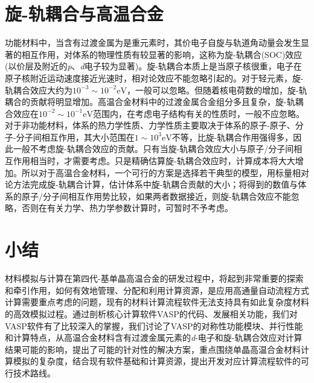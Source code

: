 \section{旋-轨耦合与高温合金}
功能材料中，当含有过渡金属为是重元素时，其价电子自旋与轨道角动量会发生显著的相互作用，对体系的物理性质有较显著的影响，这称为旋-轨耦合\textrm{(SOC)}效应(以价层及附近的\textit{p}、\textit{d}电子较为显著)。旋-轨耦合本质上是当原子核很重，电子在原子核附近运动速度接近光速时，相对论效应不能忽略引起的。对于轻元素，旋-轨耦合效应大约为$10^{-3}\sim10^{-2}\mathrm{eV}$，一般可以忽略。但随着核电荷数的增加，旋-轨耦合的贡献将明显增加。高温合金材料中的过渡金属合金组分多且复杂，旋-轨耦合效应在$10^{-2}\sim10^{-1}\mathrm{eV}$范围内，在考虑电子结构有关的性质时，一般不应忽略。对于非功能材料，体系的热力学性质、力学性质主要取决于体系的原子-原子、分子-分子间相互作用，其大小范围在$1\sim10^3\mathrm{eV}$不等，比旋-轨耦合作用强得多，因此一般不考虑旋-轨耦合效应的贡献。只有当旋-轨耦合效应大小与原子/分子间相互作用相当时，才需要考虑。只是精确估算旋-轨耦合效应时，计算成本将大大增加。所以对于高温合金材料，一个可行的方案是选择若干典型的模型，用标量相对论方法完成旋-轨耦合计算，估计体系中旋-轨耦合贡献的大小；将得到的数值与体系的原子/分子间相互作用势比较，如果两者数据接近，则旋-轨耦合效应不能忽略，否则在有关力学、热力学参数计算时，可暂时不予考虑。

\section{小结}
材料模拟与计算在第四代-基单晶高温合金的研发过程中，将起到非常重要的探索和牵引作用，如何有效地管理、分配和利用计算资源，是应用高通量自动流程方式计算需要重点考虑的问题，现有的材料计算流程软件无法支持具有如此复杂度材料的高效模拟过程。通过剖析核心计算软件\textrm{VASP}的代码、发展相关功能，我们对\textrm{VASP}软件有了比较深入的掌握，我们讨论了\textrm{VASP}的对称性功能模块、并行性能和计算特点，从高温合金材料含有过渡金属元素的\textit{d}-电子和旋-轨耦合效应对计算结果可能的影响，提出了可能的针对性的解决方案，重点围绕单晶高温合金材料计算模拟的复杂度，结合现有软件基础和计算资源，提出开发对应计算流程软件的可行技术路线。
